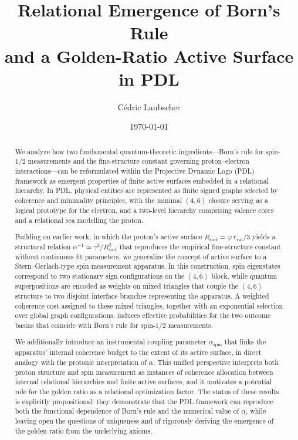 \documentclass[11pt,a4paper]{article}
\title{%
Relational Emergence of Born's Rule\\
and a Golden-Ratio Active Surface in PDL
}
\author{C\'edric Laubscher}
\date{\today}
\numberwithin{equation}{section}
\begin{document}
\maketitle

\begin{abstract}
We analyze how two fundamental quantum-theoretic ingredients—Born’s rule for spin-$1/2$ measurements and the fine-structure constant governing proton–electron interactions—can be reformulated within the Projective Dynamic Logo (PDL) framework as emergent properties of finite active surfaces embedded in a relational hierarchy. In PDL, physical entities are represented as finite signed graphs selected by coherence and minimality principles, with the minimal $(4,6)$ closure serving as a logical prototype for the electron, and a two-level hierarchy comprising valence cores and a relational sea modelling the proton. 

Building on earlier work, in which the proton’s active surface $R_{\mathrm{surf}}=\varphi\,r_{\mathrm{val}}/3$ yields a structural relation $\alpha^{-1}\simeq\gamma^2/R_{\mathrm{surf}}^2$ that reproduces the empirical fine-structure constant without continuous fit parameters, we generalize the concept of active surface to a Stern–Gerlach-type spin measurement apparatus. In this construction, spin eigenstates correspond to two stationary sign configurations on the $(4,6)$ block, while quantum superpositions are encoded as weights on mixed triangles that couple the $(4,6)$ structure to two disjoint interface branches representing the apparatus. A weighted coherence cost assigned to these mixed triangles, together with an exponential selection over global graph configurations, induces effective probabilities for the two outcome basins that coincide with Born’s rule for spin-$1/2$ measurements. 

We additionally introduce an instrumental coupling parameter $\alpha_{\mathrm{spin}}$ that links the apparatus’ internal coherence budget to the extent of its active surface, in direct analogy with the protonic interpretation of $\alpha$. This unified perspective interprets both proton structure and spin measurement as instances of coherence allocation between internal relational hierarchies and finite active surfaces, and it motivates a potential role for the golden ratio as a relational optimization factor. The status of these results is explicitly propositional: they demonstrate that the PDL framework can reproduce both the functional dependence of Born’s rule and the numerical value of $\alpha$, while leaving open the questions of uniqueness and of rigorously deriving the emergence of the golden ratio from the underlying axioms.
\end{abstract}
\end{document}
